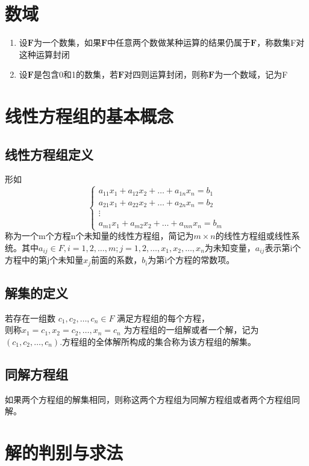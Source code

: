 \documentclass[UTF-8,a4paper]{ctexart}
\begin{document}
\section{数域}
\begin{enumerate}
    \item 设\(\mathbf{F}\)为一个数集，如果\(\mathbf{F}\)中任意两个数做某种运算的结果仍属于\(\mathbf{F}\)，称数集F对这种运算封闭
    \item 设\(\mathbf{F}\)是包含0和1的数集，若\(\mathbf{F}\)对四则运算封闭，则称\(\mathbf{F}\)为一个数域，记为F
\end{enumerate}
\section{线性方程组的基本概念}
\subsection{线性方程组定义}
形如
\[\begin{cases}
    a_{11}x_1 + a_{12}x_2 + \dots + a_{1n}x_n = b_1\\
    a_{21}x_1 + a_{22}x_2 + \dots + a_{2n}x_n = b_2\\
    \vdots \\
    a_{m1}x_1 + a_{m2}x_2 + \dots + a_{mn}x_n = b_m
\end{cases}
\]
称为一个m个方程n个未知量的线性方程组，简记为\(m \times n\)的线性方程组或线性系统。其中\(a_{ij} \in F, i=1,2,\dots ,m; j=1,2,\dots,  x_1 , x_2 , \dots , x_n\)为未知变量，\(a_{ij}\)表示第i个方程中的第j个未知量\(x_j\)前面的系数，\(b_i\)为第i个方程的常数项。

\subsection{解集的定义}
若存在一组数 \(c_1,c_2,\dots ,c_n \in F\) 满足方程组的每个方程，\\则称\(x_1=c_1,x_2=c_2,\dots ,x_n=c_n\) 为方程组的一组解或者一个解，记为\((c_1,c_2,\dots ,c_n)\).方程组的全体解所构成的集合称为该方程组的解集。

\subsection{同解方程组}
如果两个方程组的解集相同，则称这两个方程组为同解方程组或者两个方程组同解。

\section{解的判别与求法}
\end{document}
